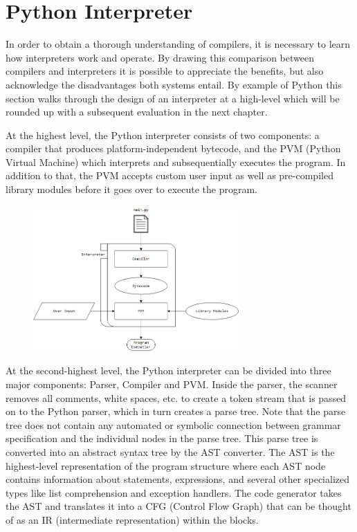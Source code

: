 \section{Python Interpreter}

In order to obtain a thorough understanding of compilers, it is necessary to learn
how interpreters work and operate. By drawing this comparison between compilers and
interpreters it is possible to appreciate the benefits, but also acknowledge the
disadvantages both systems entail. By example of Python this section walks through
the design of an interpreter at a high-level which will be rounded up with a subsequent
evaluation in the next chapter.

At the highest level, the Python interpreter consists of two components: a compiler
that produces platform-independent bytecode, and the PVM (Python Virtual Machine)
which interprets and subsequentially executes the program. In addition to that,
the PVM accepts custom user input as well as pre-compiled library modules before
it goes over to execute the program.

\begin{figure}[ht]
    \centering
    \includegraphics[width=0.7\textwidth]{images/BasicPythonArchitecture.png}
\end{figure}

At the second-highest level, the Python interpreter can be divided into three major
components: Parser, Compiler and PVM. Inside the parser, the scanner removes all
comments, white spaces, etc. to create a token stream that is passed on to the
Python parser, which in turn creates a parse tree. Note that the parse tree does
not contain any automated or symbolic connection between grammar specification and
the individual nodes in the parse tree. This parse tree is converted into an abstract
syntax tree by the AST converter. The AST is the highest-level representation of
the program structure where each AST node contains information about statements,
expressions, and several other specialized types like list comprehension and exception
handlers. The code generator takes the AST and translates it into a CFG (Control
Flow Graph) that can be thought of as an IR (intermediate representation) within
the blocks.


